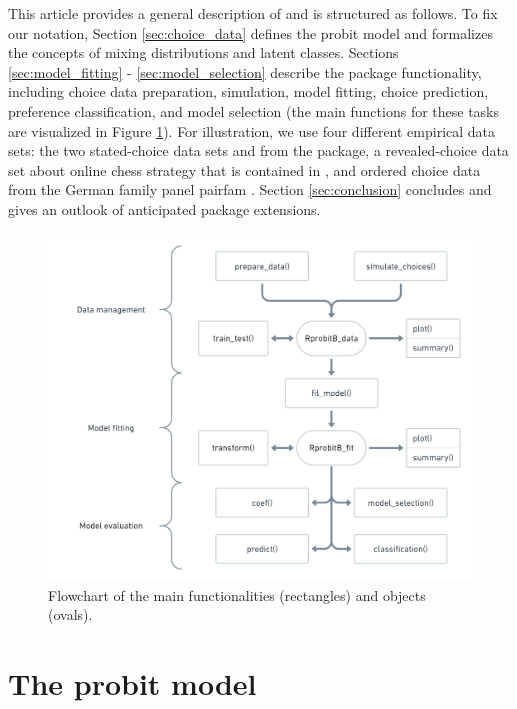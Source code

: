 \documentclass[article,shortnames]{jss}
\begin{document}
This article provides a general description of  and is structured as follows. To fix our notation, Section \ref{sec:choice_data} defines the probit model and formalizes the concepts of mixing distributions and latent classes. Sections \ref{sec:model_fitting} - \ref{sec:model_selection} describe the package functionality, including choice data preparation, simulation, model fitting, choice prediction, preference classification, and model selection (the main functions for these tasks are visualized in Figure \ref{fig:flowchart}). For illustration, we use four different empirical data sets: the two stated-choice data sets  and  from the  package, a revealed-choice data set about online chess strategy that is contained in , and ordered choice data from the German family panel pairfam \citep{Bruderl:2020}. Section \ref{sec:conclusion} concludes and gives an outlook of anticipated package extensions.

\begin{figure}[!ht]
  \includegraphics{flowchart.png}
  \caption{Flowchart of the main  functionalities (rectangles) and objects (ovals).}
  \label{fig:flowchart}
\end{figure}

\section{The probit model} \label{sec:probit_model}
\end{document}
